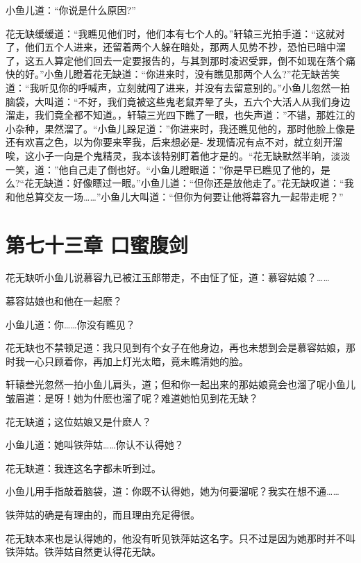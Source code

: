 \documentclass[12pt,oneside]{book}
\begin{document}
小鱼儿道：``你说是什么原因?''

花无缺缓缓道：``我瞧见他们时，他们本有七个人的。''轩辕三光拍手道：``这就对了，他们五个人进来，还留着两个人躲在暗处，那两人见势不抄，恐怕已暗中溜了，这五人算定他们回去一定要报告的，与其到那时凌迟受罪，倒不如现在落个痛快的好。''小鱼儿瞪着花无缺道：``你进来时，没有瞧见那两个人么?''花无缺苦笑道：``我听见你的呼喊声，立刻就闯了进来，并没有去留意别的。''小鱼儿忽然一拍脑袋，大叫道：``不好，我们竟被这些鬼老鼠弄晕了头，五六个大活人从我们身边溜走，我们竟全都不知道。，轩辕三光四下瞧了一眼，也失声道：''不错，那姓江的小杂种，果然溜了。``小鱼儿跺足道：''你进来时，我还瞧见他的，那时他脸上像是还有欢喜之色，以为你要来宰我，后来想必是-
发现情况有点不对，就立刻开溜唉，这小子一向是个鬼精灵，我本该特别盯着他才是的。``花无缺默然半晌，淡淡一笑，道：''他自己走了倒也好。``小鱼儿瞪眼道：''你是早已瞧见了他的，是么?``花无缺道：好像瞟过一眼。''小鱼儿道：``但你还是放他走了。''花无缺叹道：``我和他总算交友一场\ldots\ldots{}''小鱼儿大叫道：``但你为何要让他将幕容九一起带走呢？''

\hypertarget{ux7b2cux4e03ux5341ux4e09ux7ae0-ux53e3ux871cux8179ux5251}{%
\chapter{第七十三章
口蜜腹剑}\label{ux7b2cux4e03ux5341ux4e09ux7ae0-ux53e3ux871cux8179ux5251}}

花无缺听小鱼儿说慕容九已被江玉郎带走，不由怔了怔，道：慕容姑娘？\ldots\ldots{}

慕容姑娘也和他在一起麽？

小鱼儿道：你\ldots\ldots 你没有瞧见？

花无缺也不禁顿足道：我只见到有个女子在他身边，再也未想到会是慕容姑娘，那时我一心只顾着你，再加上灯光太暗，竟未瞧清她的脸。

轩辕叁光忽然一拍小鱼儿肩头，道；但和你一起出来的那姑娘竟会也溜了呢小鱼儿皱眉道：是呀！她为什麽也溜了呢？难道她怕见到花无缺？

花无缺道；这位姑娘又是什麽人？

小鱼儿道：她叫铁萍姑\ldots\ldots 你认不认得她？

花无缺道：我连这名字都未听到过。

小鱼儿用手指敲着脑袋，道：你既不认得她，她为何要溜呢？我实在想不通\ldots\ldots{}

铁萍姑的确是有理由的，而且理由充足得很。

花无缺本来也是认得她的，他没有听见铁萍姑这名字。只不过是因为她那时并不叫铁萍姑。铁萍姑自然更认得花无缺。
\end{document}
